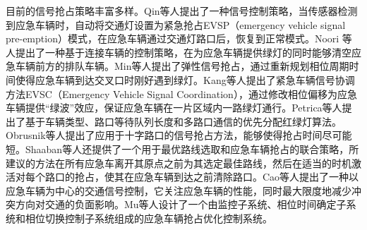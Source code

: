 
目前的信号抢占策略丰富多样。Qin等人\cite{qin_control_2012}提出了一种信号控制策略，当传感器检测到应急车辆时，自动将交通灯设置为紧急抢占EVSP（emergency vehicle signal pre-emption）模式，在应急车辆通过交通灯路口后，恢复到正常模式。Noori 等人\cite{noori2016connected}提出了一种基于连接车辆的控制策略，在为应急车辆提供绿灯的同时能够清空应急车辆前方的排队车辆。Min等人\cite{min}提出了弹性信号抢占，通过重新规划相位周期时间使得应急车辆到达交叉口时刚好遇到绿灯。Kang等人\cite{wenwen_kang_traffic_2014}提出了紧急车辆信号协调方法EVSC（Emergency Vehicle Signal Coordination），通过修改相位偏移为应急车辆提供“绿波”效应，保证应急车辆在一片区域内一路绿灯通行。Petrica等人提出了基于车辆类型、路口等待队列长度和多路口通信的优先分配红绿灯算法\cite{Petrica_2021}。Obrusnik等人提出了应用于十字路口的信号抢占方法，能够使得抢占时间尽可能短\cite{Obrusnik_2020}。Shaaban等人还提供了一个用于最优路线选取和应急车辆抢占的联合策略，所建议的方法在所有应急车离开其原点之前为其选定最佳路线，然后在适当的时机激活对每个路口的抢占，使其在应急车辆到达之前清除路口\cite{Shaaban_2019}。Cao等人提出了一种以应急车辆为中心的交通信号控制，它关注应急车辆的性能，同时最大限度地减少冲突方向对交通的负面影响\cite{Cao_2019}。Mu等人设计了一个由监控子系统、相位时间确定子系统和相位切换控制子系统组成的应急车辆抢占优化控制系统\cite{Mu_2018}。







